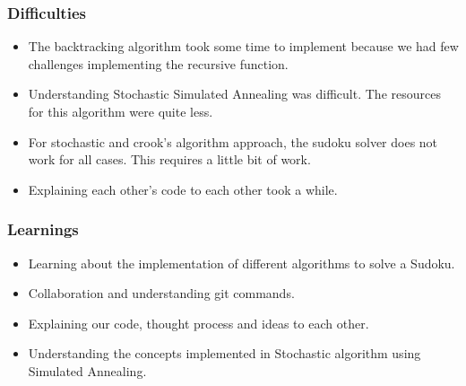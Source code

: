 \documentclass{beamer}
\begin{document}
\begin{frame}
     \frametitle{Difficulties}
     \begin{itemize}
          \item The backtracking algorithm took some time to implement because we had few challenges implementing the recursive function.
		  \item Understanding Stochastic Simulated Annealing was difficult. The resources for this algorithm were quite less.
	      \item For stochastic and crook's algorithm approach, the sudoku solver does not work for all cases. This requires a little bit of work.
		  \item Explaining each other's code to each other took a while.
\end{itemize}
\end{frame}
\begin{frame}
     \frametitle{Learnings}
     \begin{itemize}
     \item Learning about the implementation of different algorithms to solve a Sudoku.
     \item Collaboration and understanding git commands.
	 \item Explaining our code, thought process and ideas to each other.
	 \item Understanding the concepts implemented in Stochastic algorithm using Simulated Annealing.
\end{itemize}         
\end{frame}
\end{document}
